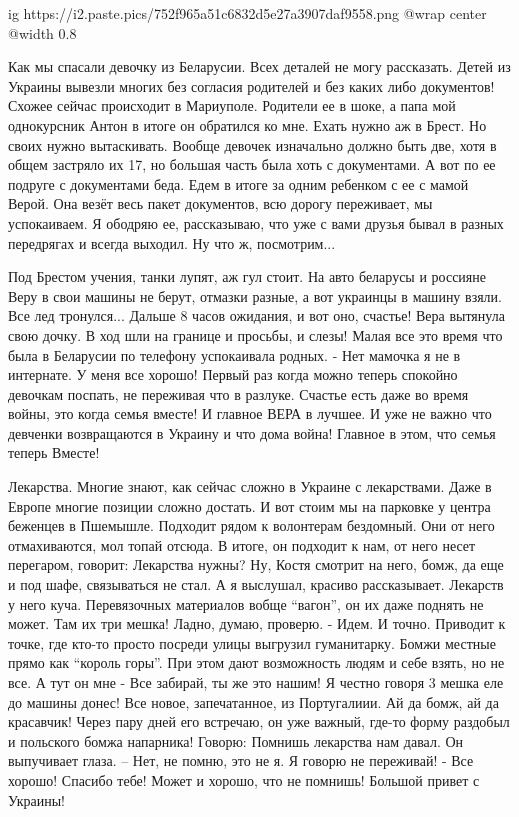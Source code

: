 \ifcmt
  ig https://i2.paste.pics/752f965a51c6832d5e27a3907daf9558.png
  @wrap center
  @width 0.8
\fi

Как мы спасали девочку из Беларусии. Всех деталей не могу рассказать. Детей из
Украины вывезли многих без согласия родителей и без каких либо документов!
Схожее сейчас происходит в Мариуполе. Родители ее в шоке, а папа мой
однокурсник Антон в итоге он обратился ко мне. Ехать нужно аж в Брест. Но своих
нужно вытаскивать. Вообще девочек изначально  должно быть две, хотя в общем
застряло их 17,  но большая часть была хоть с документами.  А вот по ее подруге
с документами беда.  Едем в итоге  за  одним ребенком с ее с мамой Верой.  Она
везёт весь пакет документов, всю дорогу переживает, мы успокаиваем.  Я ободряю
ее, рассказываю, что  уже с вами друзья  бывал в разных передрягах и всегда
выходил. Ну что ж, посмотрим...

Под Брестом учения, танки лупят, аж гул стоит. На авто беларусы и россияне Веру
в свои машины не берут, отмазки разные, а вот украинцы в машину взяли. Все лед
тронулся... Дальше 8 часов ожидания, и вот оно, счастье! Вера вытянула свою
дочку.  В ход шли  на границе и  просьбы, и слезы!  Малая все это время что
была в Беларусии по телефону успокаивала родных. - Нет мамочка я не в
интернате. У меня все хорошо! Первый раз когда можно теперь спокойно девочкам
поспать, не переживая что в разлуке.  Счастье есть даже во время войны, это
когда семья вместе! И главное ВЕРА в лучшее. И уже не важно что девченки
возвращаются в Украину и что дома война! Главное в этом, что семья теперь
Вместе!

Лекарства. Многие знают, как сейчас сложно  в Украине с лекарствами. Даже в
Европе многие позиции сложно достать. И вот стоим мы на парковке у центра
беженцев в Пшемышле. Подходит рядом к волонтерам бездомный. Они от него
отмахиваются, мол топай отсюда. В итоге, он подходит к нам, от него несет
перегаром, говорит: Лекарства нужны? Ну, Костя смотрит на него, бомж, да еще и
под шафе, связываться не стал. А я выслушал, красиво рассказывает. Лекарств у
него куча. Перевязочных материалов вобще \enquote{вагон}, он их даже поднять не
может.  Там их три мешка! Ладно, думаю, проверю. - Идем. И точно. Приводит к
точке, где кто-то просто посреди улицы выгрузил гуманитарку. Бомжи местные
прямо как \enquote{король горы}. При этом дают возможность людям и себе взять,
но не все. А тут он мне - Все забирай, ты же это нашим! Я честно говоря 3 мешка
еле до машины донес! Все новое, запечатанное, из Португалиии. Ай да бомж, ай да
красавчик!  Через пару дней его встречаю, он уже важный, где-то форму раздобыл
и польского бомжа напарника! Говорю: Помнишь лекарства нам давал. Он
выпучивает глаза. – Нет, не помню, это не я. Я говорю не переживай! - Все
хорошо!  Спасибо тебе!
Может и хорошо, что не помнишь! Большой привет с Украины!

